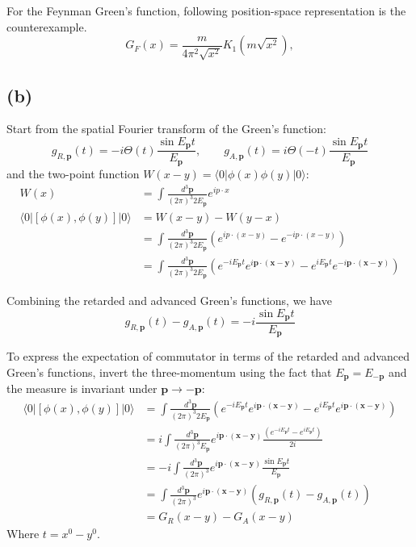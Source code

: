 \documentclass[a4paper,11pt]{article}
\begin{document}
For the Feynman Green's function, following position-space representation is the counterexample.
\begin{equation}
    G_F(x) = \frac{m}{4\pi^2\sqrt{x^2}}K_1\left(m\sqrt{x^2}\right),
\end{equation}

\subsection{(b)}


Start from the spatial Fourier transform of the Green's function:
\begin{equation}
    g_{R, \mathbf{p}}(t) = -i\Theta(t)\frac{\sin E_{\mathbf{p}}t}{E_{\mathbf{p}}},\qquad g_{A, \mathbf{p}}(t) = i\Theta(-t)\frac{\sin E_{\mathbf{p}}t}{E_{\mathbf{p}}}
\end{equation}
and the two-point function $W(x-y)=\langle 0|\phi(x)\phi(y)|0\rangle$:
\begin{align}
    W(x) &= \int\frac{d^3\mathbf{p}}{(2\pi)^3 2E_{\mathbf{p}}}e^{ip\cdot x} \\
    \langle 0|[\phi(x), \phi(y)]|0\rangle &=W(x-y) - W(y-x)\\
    &=\int\frac{d^3\mathbf{p}}{(2\pi)^3 2E_{\mathbf{p}}}\left(e^{ip\cdot(x-y)} - e^{-ip\cdot(x-y)}\right) \\
    &=\int\frac{d^3\mathbf{p}}{(2\pi)^3 2E_{\mathbf{p}}}\left(e^{-iE_{\mathbf{p}}t}e^{i\mathbf{p}\cdot(\mathbf{x}-\mathbf{y})} - e^{iE_{\mathbf{p}}t}e^{-i\mathbf{p}\cdot(\mathbf{x}-\mathbf{y})}\right)
\end{align}

Combining the retarded and advanced Green's functions, we have
\begin{equation}
    g_{R, \mathbf{p}}(t) - g_{A, \mathbf{p}}(t) = -i\frac{\sin E_{\mathbf{p}}t}{E_{\mathbf{p}}}
\end{equation}

To express the expectation of commutator in terms of the retarded and advanced Green's functions, invert the three-momentum using the fact that $E_{\mathbf{p}}=E_{-\mathbf{p}}$ and the measure is invariant under $\mathbf{p}\to -\mathbf{p}$:
\begin{align}
    \langle 0|[\phi(x), \phi(y)]|0\rangle &=\int\frac{d^3\mathbf{p}}{(2\pi)^3 2E_{\mathbf{p}}}\left(e^{-iE_{\mathbf{p}}t}e^{i\mathbf{p}\cdot(\mathbf{x}-\mathbf{y})} - e^{iE_{\mathbf{p}}t}e^{i\mathbf{p}\cdot(\mathbf{x}-\mathbf{y})}\right)\\
    &=i\int\frac{d^3\mathbf{p}}{(2\pi)^3 E_{\mathbf{p}}}e^{i\mathbf{p}\cdot(\mathbf{x}-\mathbf{y})}\frac{\left(e^{-iE_{\mathbf{p}}t} - e^{iE_{\mathbf{p}}t}\right)}{2i}\\
    &=-i\int\frac{d^3\mathbf{p}}{(2\pi)^3}e^{i\mathbf{p}\cdot(\mathbf{x}-\mathbf{y})}\frac{\sin E_{\mathbf{p}}t}{E_{\mathbf{p}}}\\
    &=\int\frac{d^3\mathbf{p}}{(2\pi)^3}e^{i\mathbf{p}\cdot(\mathbf{x}-\mathbf{y})}\left(g_{R, \mathbf{p}}(t) - g_{A, \mathbf{p}}(t)\right)\\
    &=G_R(x-y) - G_A(x-y)
\end{align}
Where $t=x^0-y^0$. 
\end{document}
